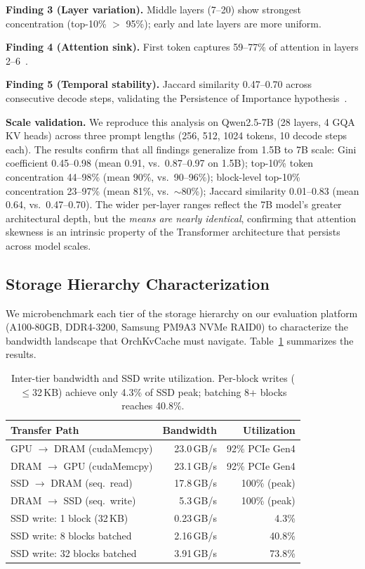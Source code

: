 \documentclass[conference]{IEEEtran}
\begin{document}
\textbf{Finding 3 (Layer variation).} Middle layers (7--20) show strongest concentration (top-10\% $>$ 95\%); early and late layers are more uniform.

\textbf{Finding 4 (Attention sink).} First token captures 59--77\% of attention in layers 2--6~\cite{streamingllm}.

\textbf{Finding 5 (Temporal stability).} Jaccard similarity 0.47--0.70 across consecutive decode steps, validating the Persistence of Importance hypothesis~\cite{scissorhands}.

\textbf{Scale validation.} We reproduce this analysis on Qwen2.5-7B (28 layers, 4 GQA KV heads) across three prompt lengths (256, 512, 1024 tokens, 10 decode steps each). The results confirm that all findings generalize from 1.5B to 7B scale: Gini coefficient 0.45--0.98 (mean 0.91, vs.\ 0.87--0.97 on 1.5B); top-10\% token concentration 44--98\% (mean 90\%, vs.\ 90--96\%); block-level top-10\% concentration 23--97\% (mean 81\%, vs.\ ${\sim}$80\%); Jaccard similarity 0.01--0.83 (mean 0.64, vs.\ 0.47--0.70). The wider per-layer ranges reflect the 7B model's greater architectural depth, but the \emph{means are nearly identical}, confirming that attention skewness is an intrinsic property of the Transformer architecture that persists across model scales.

\subsection{Storage Hierarchy Characterization}
\label{sec:storage-char}

We microbenchmark each tier of the storage hierarchy on our evaluation platform (A100-80GB, DDR4-3200, Samsung PM9A3 NVMe RAID0) to characterize the bandwidth landscape that OrchKvCache must navigate. Table~\ref{tab:storage-char} summarizes the results.

\begin{table}[t]
\centering
\caption{Inter-tier bandwidth and SSD write utilization. Per-block writes ($\leq$32\,KB) achieve only 4.3\% of SSD peak; batching 8+ blocks reaches 40.8\%.}
\label{tab:storage-char}
\small
\begin{tabular}{@{}lrr@{}}
\toprule
Transfer Path & Bandwidth & Utilization \\
\midrule
GPU $\to$ DRAM (cudaMemcpy) & 23.0\,GB/s & 92\% PCIe Gen4 \\
DRAM $\to$ GPU (cudaMemcpy) & 23.1\,GB/s & 92\% PCIe Gen4 \\
SSD $\to$ DRAM (seq.\ read)  & 17.8\,GB/s & 100\% (peak) \\
DRAM $\to$ SSD (seq.\ write) & 5.3\,GB/s & 100\% (peak) \\
\midrule
SSD write: 1 block (32\,KB)  & 0.23\,GB/s & 4.3\% \\
SSD write: 8 blocks batched  & 2.16\,GB/s & 40.8\% \\
SSD write: 32 blocks batched & 3.91\,GB/s & 73.8\% \\
\bottomrule
\end{tabular}
\end{table}
\end{document}

